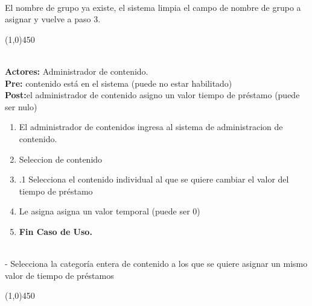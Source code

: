 \documentclass[11pt, a4paper, spanish]{article}
\begin{document}
{\begin{enumerate}
\end{enumerate}
 \\
 El nombre de grupo ya existe, el sistema limpia el campo de nombre de grupo a asignar y vuelve a paso 3.
\begin{center} \line(1,0){450} \end{center}



	 \\
\textbf{Actores:} Administrador de contenido. \\
\textbf{Pre:} contenido está en el sistema (puede no estar habilitado) \\
\textbf{Post:}el administrador de contenido asigno un valor tiempo de préstamo (puede ser nulo)\\
\begin{enumerate}
	\item El administrador de contenidos ingresa al sistema de administracion de contenido.
	\item Seleccion de contenido
	\item .1 Selecciona el contenido individual al que se quiere cambiar el valor del tiempo de préstamo
	\item Le asigna asigna un valor temporal (puede ser 0)
\item \textbf{Fin Caso de Uso.} \\

\end{enumerate}
 \\
 - Selecciona la categoría entera de contenido a los que se quiere asignar un mismo valor de tiempo de préstamos
\begin{center} \line(1,0){450} \end{center}


}
\end{document}

